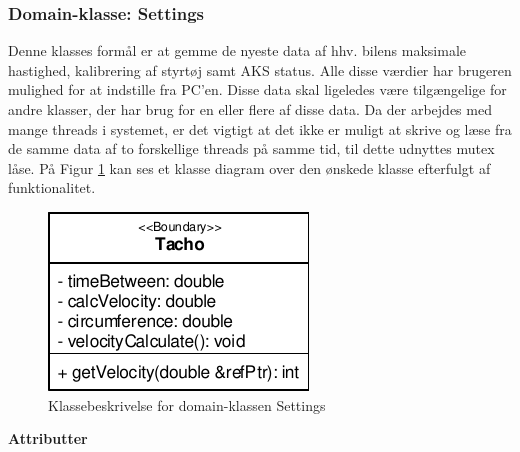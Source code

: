 \subsubsection{Domain-klasse: Settings}

Denne klasses formål er at gemme de nyeste data af hhv. bilens maksimale hastighed, kalibrering af styrtøj samt AKS status. Alle disse værdier har brugeren mulighed for at indstille fra PC'en. Disse data skal ligeledes være tilgængelige for andre klasser, der har brug for en eller flere af disse data. Da der arbejdes med mange threads i systemet, er det vigtigt at det ikke er muligt at skrive og læse fra de samme data af to forskellige threads på samme tid, til dette udnyttes mutex låse. På Figur \ref{fig:cd_settings} kan ses et klasse diagram over den ønskede klasse efterfulgt af funktionalitet.

\begin{figure}[h]
\centering
\includegraphics[]{../fig/diagrammer/bil/cd_tachometer.pdf}
\caption{Klassebeskrivelse for domain-klassen Settings}
\label{fig:cd_settings}
\end{figure}

\textbf{Attributter}

